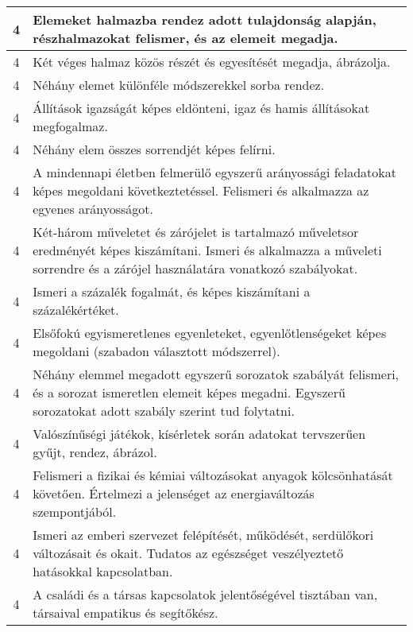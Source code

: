 \begin{longtable}{c | p{12cm} }
                                
                                          4 &  Elemeket halmazba rendez adott tulajdonság alapján, részhalmazokat felismer, és az elemeit megadja. \\ \hline
                                          4 &  Két véges halmaz közös részét és egyesítését megadja, ábrázolja. \\ \hline
                                          4 &  Néhány elemet különféle módszerekkel sorba rendez. \\ \hline
                                          4 &  Állítások igazságát képes eldönteni, igaz és hamis állításokat megfogalmaz. \\ \hline
                                          4 &  Néhány elem összes sorrendjét képes felírni. \\ \hline
                                          4 &  A mindennapi életben felmerülő egyszerű arányossági feladatokat képes megoldani következtetéssel. Felismeri és alkalmazza az egyenes arányosságot. \\ \hline
                                          4 &  Két-három műveletet és zárójelet is tartalmazó műveletsor eredményét képes kiszámítani. Ismeri és alkalmazza a műveleti sorrendre és a zárójel használatára vonatkozó szabályokat. \\ \hline
                                          4 &  Ismeri a százalék fogalmát, és képes kiszámítani a százalékértéket. \\ \hline
                                          4 &  Elsőfokú egyismeretlenes egyenleteket, egyenlőtlenségeket képes megoldani (szabadon választott módszerrel). \\ \hline
                                          4 &  Néhány elemmel megadott egyszerű sorozatok szabályát felismeri, és a sorozat ismeretlen elemeit képes megadni. Egyszerű sorozatokat adott szabály szerint tud folytatni. \\ \hline
                                          4 &  Valószínűségi játékok, kísérletek során adatokat tervszerűen gyűjt, rendez, ábrázol. \\ \hline
                                          4 &  Felismeri a fizikai és kémiai változásokat anyagok kölcsönhatását követően. Értelmezi a jelenséget az energiaváltozás szempontjából. \\ \hline
                                          4 &  Ismeri az emberi szervezet felépítését, működését, serdülőkori változásait és okait. Tudatos az egészséget veszélyeztető hatásokkal kapcsolatban. \\ \hline
                                          4 &  A családi és a társas kapcsolatok jelentőségével tisztában van, társaival empatikus és segítőkész. \\ \hline
                                      
                        \end{longtable}
            \clearpage

